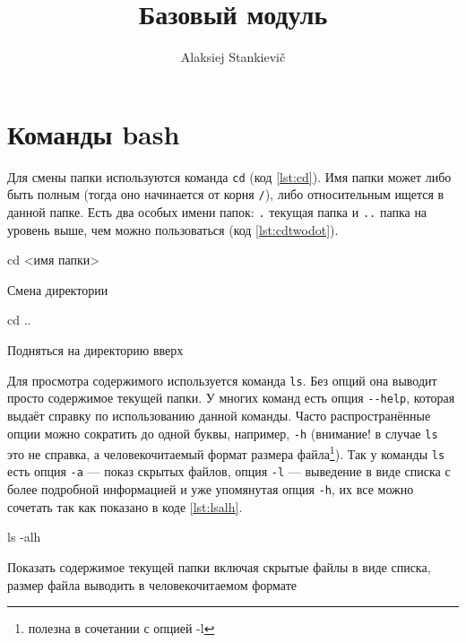 \documentclass[12pt]{article}
\author{Alaksiej Stankievič}
\title{Базовый модуль}
\begin{document}

\section{Команды bash}
Для смены папки используются команда \verb|cd| (код \ref{lst:cd}). Имя папки может либо быть полным (тогда оно начинается от корня \verb|/|), либо относительным ищется в данной папке. Есть два особых имени папок: \verb|.| текущая папка и \verb|..| папка на уровень выше, чем можно пользоваться (код \ref{lst:cdtwodot}). 
\begin{listing}[H]
\begin{center}
\begin{bashcode}
cd <имя папки>
\end{bashcode}
\end{center}
\caption{Смена директории}
\label{lst:cd}
\end{listing}

\begin{listing}[H]
\begin{center}
\begin{bashcode}
cd ..
\end{bashcode}
\end{center}
\caption{Подняться на директорию вверх}
\label{lst:cdtwodot}
\end{listing}

Для просмотра содержимого используется команда \verb|ls|. Без опций она выводит просто содержимое текущей папки. У многих команд есть опция \verb|--help|, которая выдаёт справку по использованию данной команды. Часто распространённые опции можно сократить до одной буквы, например, \verb|-h| (внимание! в случае \verb|ls| это не справка, а человекочитаемый формат размера файла\footnote{полезна в сочетании с опцией -l}). Так у команды \verb|ls| есть опция \verb|-a| --- показ скрытых файлов, опция \verb|-l| --- выведение в виде списка с более подробной информацией и уже упомянутая опция \verb|-h|, их все можно сочетать так как показано в коде \ref{lst:lsalh}.

\begin{listing}[H]
\begin{center}
\begin{bashcode}
ls -alh
\end{bashcode}
\end{center}
\caption{Показать содержимое текущей папки включая скрытые файлы в виде списка, размер файла выводить в человекочитаемом формате}
\label{lst:lsalh}
\end{listing}
\end{document}
